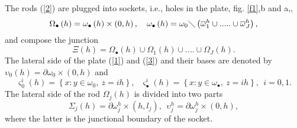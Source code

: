 \documentclass[11pt]{article}%
\numberwithin{equation}{section}
\begin{document}
The rods (\ref{2}) are plugged into sockets, i.e., holes in the plate, fig.
\ref{f1},b and a,,%
\begin{equation}
\Omega_{\bullet}\left(  h\right)  =\mathbb{\omega}_{\bullet}\left(  h\right)
\times\left(  0,h\right)  ,\ \ \ \mathbb{\omega}_{\bullet}\left(  h\right)
=\mathbb{\omega}_{0}\mathbb{\diagdown}\left(  \overline{\mathbb{\omega}}%
_{1}^{h}\cup.....\cup\overline{\mathbb{\omega}}_{{J}}^{h}\right)  , \label{3}%
\end{equation}
and compose the junction%
\begin{equation}
\Xi\left(  h\right)  =\Omega_{\bullet}\left(  h\right)  \cup\Omega_{1}\left(
h\right)  \cup....\cup\Omega_{J}\left(  h\right)  . \label{4}%
\end{equation}
The lateral side of the plate (\ref{1}) and (\ref{3}) and their bases are
denoted by $\mathbb{\upsilon}_{0}\left(  h\right)  =\partial\omega_{0}%
\times(0,h)$ and%
\begin{equation}
\varsigma_{0}^{i}\left(  h\right)  =\left\{  x:y\in\mathbb{\omega}%
_{0},\ z=ih\right\}  ,\ \ \ \varsigma_{\bullet}^{i}\left(  h\right)  =\left\{
x:y\in\mathbb{\omega}_{\bullet},\ z=ih\right\}  ,\ \ i=0,1. \label{5}%
\end{equation}
The lateral side of the rod $\Omega_{j}\left(  h\right)  $ is divided into two
parts%
\[
\Sigma_{j}\left(  h\right)  =\partial\mathbb{\omega}_{j}^{h}\times\left(
h,l_{j}\right)  ,\ \ \mathbb{\upsilon}_{j}^{h}=\partial\mathbb{\omega}_{j}%
^{h}\times\left(  0,h\right)  ,
\]
where the latter is the junctional boundary of the socket.
\end{document}
